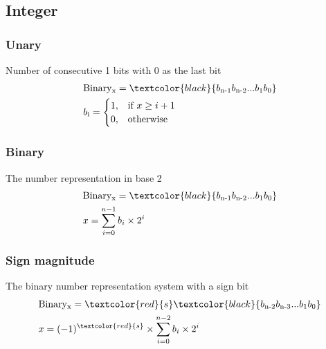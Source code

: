 \subsection{Integer}

\begin{frame}
    \frametitle{Unary}
    Number of consecutive 1 bits with 0 as the last bit
    \begin{equation}
        \begin{aligned}
            &\text{Binary}\textsubscript{x}=\textcolor{black}{b\textsubscript{n-1}b\textsubscript{n-2}...b\textsubscript{1}b\textsubscript{0}}\\
            &b\textsubscript{i}=
                \begin{cases}
                    1,& \text{if } x\geq i+1\\
                    0, & \text{otherwise}
                \end{cases}
        \end{aligned}
    \end{equation}
\end{frame}


\begin{frame}
    \frametitle{Binary}
    The number representation in base 2
    \begin{equation}
        \begin{aligned}
            &\text{Binary}\textsubscript{x}=\textcolor{black}{b\textsubscript{n-1}b\textsubscript{n-2}...b\textsubscript{1}b\textsubscript{0}}\\
            &x=\sum_{i=0}^{n-1} b_i \times 2^i
        \end{aligned}
    \end{equation}
\end{frame}

\begin{frame}
    \frametitle{Sign magnitude}
    The binary number representation system with a sign bit
    \begin{equation}
        \begin{aligned}
            &\text{Binary}\textsubscript{x}=\textcolor{red}{s}\textcolor{black}{b\textsubscript{n-2}b\textsubscript{n-3}...b\textsubscript{1}b\textsubscript{0}}\\
            &x=(-1)^{\textcolor{red}{s}} \times \sum_{i=0}^{n-2} b_i \times 2^i
        \end{aligned}
    \end{equation}
\end{frame}

